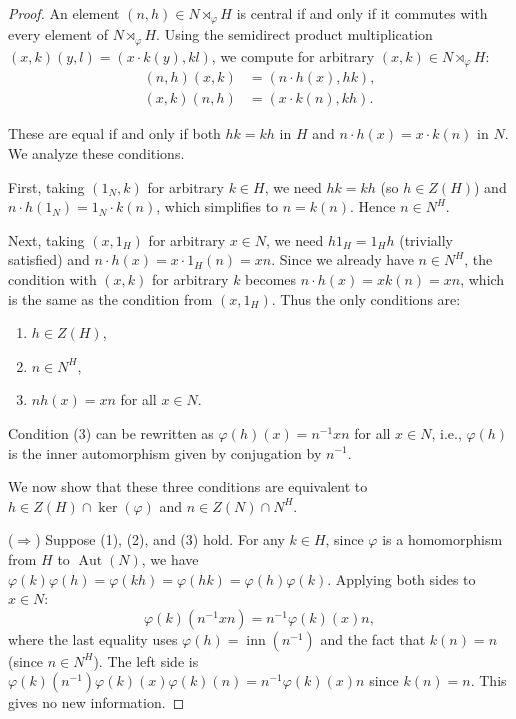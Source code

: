 \begin{proof}
    An element $(n,h) \in N \rtimes_\varphi H$ is central if and only if it commutes with every element of $N \rtimes_\varphi H$. Using the semidirect product multiplication $(x,k)(y,l) = (x \cdot k(y), kl)$, we compute for arbitrary $(x,k) \in N \rtimes_\varphi H$:
    \begin{align*}
        (n,h)(x,k) &= (n \cdot h(x), hk), \\
        (x,k)(n,h) &= (x \cdot k(n), kh).
    \end{align*}

    These are equal if and only if both $hk = kh$ in $H$ and $n \cdot h(x) = x \cdot k(n)$ in $N$. We analyze these conditions.

    First, taking $(1_N, k)$ for arbitrary $k \in H$, we need $hk = kh$ (so $h \in Z(H)$) and $n \cdot h(1_N) = 1_N \cdot k(n)$, which simplifies to $n = k(n)$. Hence $n \in N^H$.

    Next, taking $(x, 1_H)$ for arbitrary $x \in N$, we need $h1_H = 1_H h$ (trivially satisfied) and $n \cdot h(x) = x \cdot 1_H(n) = xn$. Since we already have $n \in N^H$, the condition with $(x,k)$ for arbitrary $k$ becomes $n \cdot h(x) = x k(n) = xn$, which is the same as the condition from $(x, 1_H)$. Thus the only conditions are:
    \begin{enumerate}
        \item $h \in Z(H)$,
        \item $n \in N^H$,
        \item $n h(x) = xn$ for all $x \in N$.
    \end{enumerate}

    Condition (3) can be rewritten as $\varphi(h)(x) = n^{-1}xn$ for all $x \in N$, i.e., $\varphi(h)$ is the inner automorphism given by conjugation by $n^{-1}$.

    We now show that these three conditions are equivalent to $h \in Z(H) \cap \ker(\varphi)$ and $n \in Z(N) \cap N^H$.

    ($\Rightarrow$) Suppose (1), (2), and (3) hold. For any $k \in H$, since $\varphi$ is a homomorphism from $H$ to $\operatorname{Aut}(N)$, we have $\varphi(k)\varphi(h) = \varphi(kh) = \varphi(hk) = \varphi(h)\varphi(k)$. Applying both sides to $x \in N$:
    $$\varphi(k)(n^{-1}xn) = n^{-1}\varphi(k)(x)n,$$
    where the last equality uses $\varphi(h) = \operatorname{inn}(n^{-1})$ and the fact that $k(n) = n$ (since $n \in N^H$). The left side is $\varphi(k)(n^{-1})\varphi(k)(x)\varphi(k)(n) = n^{-1}\varphi(k)(x)n$ since $k(n) = n$. This gives no new information.


\end{proof}
